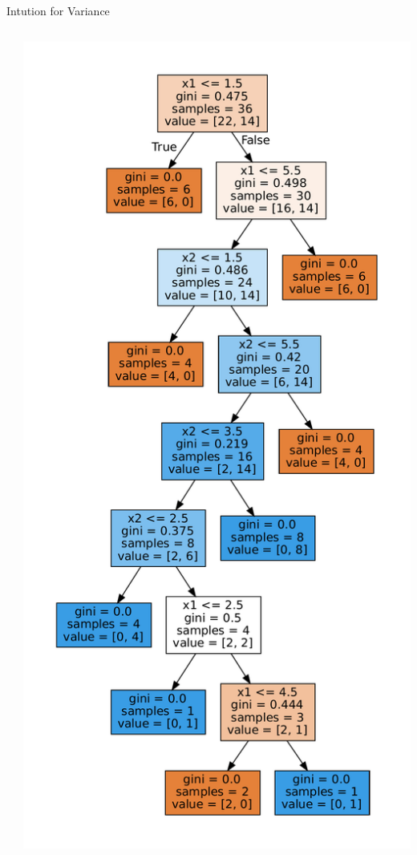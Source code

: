 \documentclass[usenames,dvipsnames]{beamer}
\begin{document}
\begin{frame}{Intution for Variance}
\begin{columns}
\begin{column}{0.5\textwidth}
\begin{center}
\end{center}
\end{column}
\begin{column}{0.5\textwidth}
\begin{center}
\includegraphics[scale=0.2]{../assets/bias-variance/figures/bias-variance-full-depth-2-sklearn.pdf}
\end{center}
\end{column}
\end{columns}
\end{frame}
\end{document}
